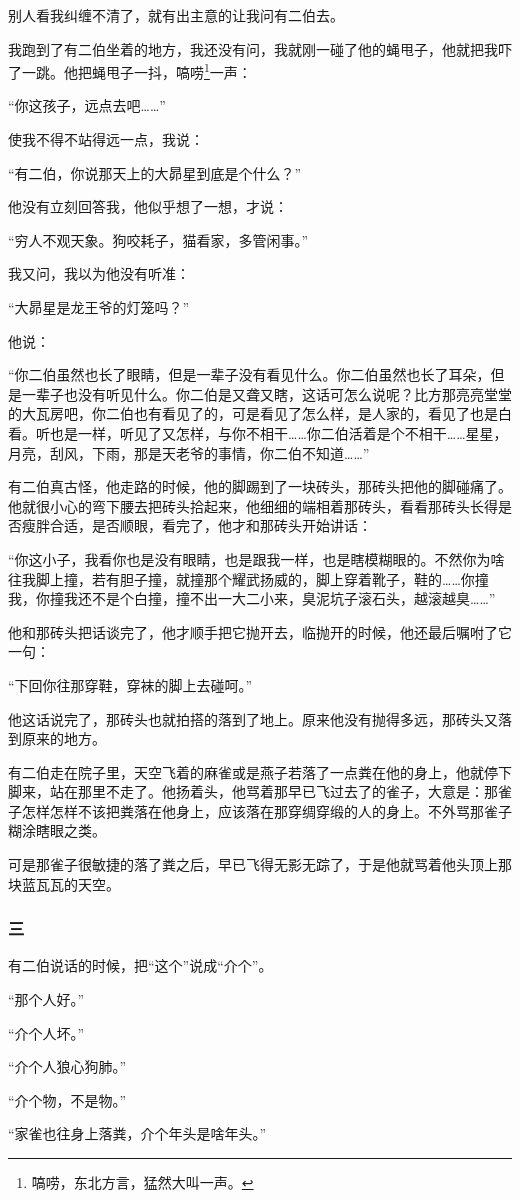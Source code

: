 \par 别人看我纠缠不清了，就有出主意的让我问有二伯去。
\par 我跑到了有二伯坐着的地方，我还没有问，我就刚一碰了他的蝇甩子，他就把我吓了一跳。他把蝇甩子一抖，嗃唠\footnote{嗃唠，东北方言，猛然大叫一声。}一声：
\par “你这孩子，远点去吧……”
\par 使我不得不站得远一点，我说：
\par “有二伯，你说那天上的大昴星到底是个什么？”
\par 他没有立刻回答我，他似乎想了一想，才说：
\par “穷人不观天象。狗咬耗子，猫看家，多管闲事。”
\par 我又问，我以为他没有听准：
\par “大昴星是龙王爷的灯笼吗？”
\par 他说：
\par “你二伯虽然也长了眼睛，但是一辈子没有看见什么。你二伯虽然也长了耳朵，但是一辈子也没有听见什么。你二伯是又聋又瞎，这话可怎么说呢？比方那亮亮堂堂的大瓦房吧，你二伯也有看见了的，可是看见了怎么样，是人家的，看见了也是白看。听也是一样，听见了又怎样，与你不相干……你二伯活着是个不相干……星星，月亮，刮风，下雨，那是天老爷的事情，你二伯不知道……”
\par 有二伯真古怪，他走路的时候，他的脚踢到了一块砖头，那砖头把他的脚碰痛了。他就很小心的弯下腰去把砖头拾起来，他细细的端相着那砖头，看看那砖头长得是否瘦胖合适，是否顺眼，看完了，他才和那砖头开始讲话：
\par “你这小子，我看你也是没有眼睛，也是跟我一样，也是瞎模糊眼的。不然你为啥往我脚上撞，若有胆子撞，就撞那个耀武扬威的，脚上穿着靴子，鞋的……你撞我，你撞我还不是个白撞，撞不出一大二小来，臭泥坑子滚石头，越滚越臭……”
\par 他和那砖头把话谈完了，他才顺手把它抛开去，临抛开的时候，他还最后嘱咐了它一句：
\par “下回你往那穿鞋，穿袜的脚上去碰呵。”
\par 他这话说完了，那砖头也就拍搭的落到了地上。原来他没有抛得多远，那砖头又落到原来的地方。
\par 有二伯走在院子里，天空飞着的麻雀或是燕子若落了一点粪在他的身上，他就停下脚来，站在那里不走了。他扬着头，他骂着那早已飞过去了的雀子，大意是：那雀子怎样怎样不该把粪落在他身上，应该落在那穿绸穿缎的人的身上。不外骂那雀子糊涂瞎眼之类。
\par 可是那雀子很敏捷的落了粪之后，早已飞得无影无踪了，于是他就骂着他头顶上那块蓝瓦瓦的天空。
\subsubsection*{三}
\par 有二伯说话的时候，把“这个”说成“介个”。
\par “那个人好。”
\par “介个人坏。”
\par “介个人狼心狗肺。”
\par “介个物，不是物。”
\par “家雀也往身上落粪，介个年头是啥年头。”
